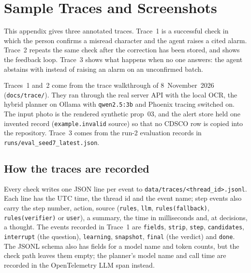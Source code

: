 \chapter{Sample Traces and Screenshots}
\label{app:traces}

This appendix gives three annotated traces. Trace~1 is a successful check in which the person confirms a misread character and the agent raises a cited alarm. Trace~2 repeats the same check after the correction has been stored, and shows the feedback loop. Trace~3 shows what happens when no one answers: the agent abstains with \CANTV{} instead of raising an alarm on an unconfirmed batch.

Traces~1 and~2 come from the trace walkthrough of 8~November~2026 (\texttt{docs/trace/}). They ran through the real server API with the local OCR, the hybrid planner on Ollama with \texttt{qwen2.5:3b} and Phoenix tracing switched on. The input photo is the rendered synthetic prop~03, and the alert store held one invented record (\texttt{example.invalid} source) so that no CDSCO row is copied into the repository. Trace~3 comes from the run-2 evaluation records in \texttt{runs/eval\_seed7\_latest.json}.

\section{How the traces are recorded}
\label{sec:app-traces-format}

Every check writes one JSON line per event to \texttt{data/traces/<thread\_id>.jsonl}. Each line has the UTC time, the thread id and the event name; step events also carry the step number, action, source (\texttt{rules}, \texttt{llm}, \texttt{rules(fallback)}, \texttt{rules(verifier)} or \texttt{user}), a summary, the time in milliseconds and, at decisions, a thought. The events recorded in Trace~1 are \texttt{fields}, \texttt{strip}, \texttt{step}, \texttt{candidates}, \texttt{interrupt} (the question), \texttt{learning}, \texttt{snapshot}, \texttt{final} (the verdict) and \texttt{done}. The JSONL schema also has fields for a model name and token counts, but the check path leaves them empty; the planner's model name and call time are recorded in the OpenTelemetry LLM span instead.

